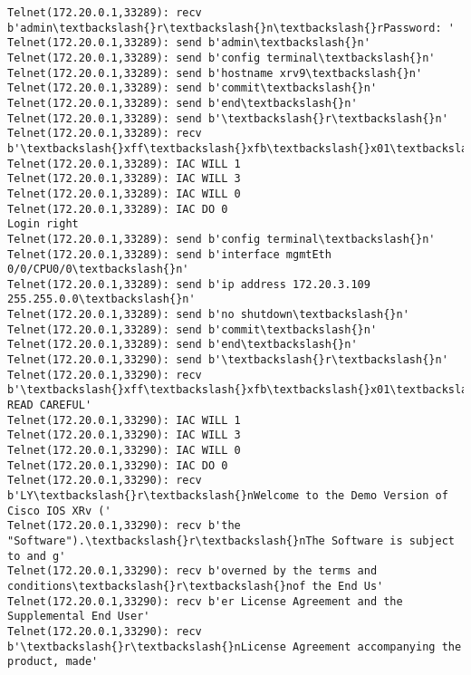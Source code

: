 \documentclass[11pt]{article}
\begin{document}
\begin{Verbatim}[commandchars=\\\{\}]
Telnet(172.20.0.1,33289): recv b'admin\textbackslash{}r\textbackslash{}n\textbackslash{}rPassword: '
Telnet(172.20.0.1,33289): send b'admin\textbackslash{}n'
Telnet(172.20.0.1,33289): send b'config terminal\textbackslash{}n'
Telnet(172.20.0.1,33289): send b'hostname xrv9\textbackslash{}n'
Telnet(172.20.0.1,33289): send b'commit\textbackslash{}n'
Telnet(172.20.0.1,33289): send b'end\textbackslash{}n'
Telnet(172.20.0.1,33289): send b'\textbackslash{}r\textbackslash{}n'
Telnet(172.20.0.1,33289): recv b'\textbackslash{}xff\textbackslash{}xfb\textbackslash{}x01\textbackslash{}xff\textbackslash{}xfb\textbackslash{}x03\textbackslash{}xff\textbackslash{}xfb\textbackslash{}x00\textbackslash{}xff\textbackslash{}xfd\textbackslash{}x00\textbackslash{}x1b]0;xrv9\textbackslash{}x07\textbackslash{}r\textbackslash{}n\textbackslash{}rRP/0/0/CPU0:xrv9\#\textbackslash{}r\textbackslash{}n\textbackslash{}rRP/0/0'
Telnet(172.20.0.1,33289): IAC WILL 1
Telnet(172.20.0.1,33289): IAC WILL 3
Telnet(172.20.0.1,33289): IAC WILL 0
Telnet(172.20.0.1,33289): IAC DO 0
Login right
Telnet(172.20.0.1,33289): send b'config terminal\textbackslash{}n'
Telnet(172.20.0.1,33289): send b'interface mgmtEth 0/0/CPU0/0\textbackslash{}n'
Telnet(172.20.0.1,33289): send b'ip address 172.20.3.109 255.255.0.0\textbackslash{}n'
Telnet(172.20.0.1,33289): send b'no shutdown\textbackslash{}n'
Telnet(172.20.0.1,33289): send b'commit\textbackslash{}n'
Telnet(172.20.0.1,33289): send b'end\textbackslash{}n'
Telnet(172.20.0.1,33290): send b'\textbackslash{}r\textbackslash{}n'
Telnet(172.20.0.1,33290): recv b'\textbackslash{}xff\textbackslash{}xfb\textbackslash{}x01\textbackslash{}xff\textbackslash{}xfb\textbackslash{}x03\textbackslash{}xff\textbackslash{}xfb\textbackslash{}x00\textbackslash{}xff\textbackslash{}xfd\textbackslash{}x00\textbackslash{}x1b]0;xrv10\textbackslash{}x07\textbackslash{}r\textbackslash{}n\textbackslash{}r\textbackslash{}nIMPORTANT:  READ CAREFUL'
Telnet(172.20.0.1,33290): IAC WILL 1
Telnet(172.20.0.1,33290): IAC WILL 3
Telnet(172.20.0.1,33290): IAC WILL 0
Telnet(172.20.0.1,33290): IAC DO 0
Telnet(172.20.0.1,33290): recv b'LY\textbackslash{}r\textbackslash{}nWelcome to the Demo Version of Cisco IOS XRv ('
Telnet(172.20.0.1,33290): recv b'the "Software").\textbackslash{}r\textbackslash{}nThe Software is subject to and g'
Telnet(172.20.0.1,33290): recv b'overned by the terms and conditions\textbackslash{}r\textbackslash{}nof the End Us'
Telnet(172.20.0.1,33290): recv b'er License Agreement and the Supplemental End User'
Telnet(172.20.0.1,33290): recv b'\textbackslash{}r\textbackslash{}nLicense Agreement accompanying the product, made'

\end{Verbatim}
\end{document}
